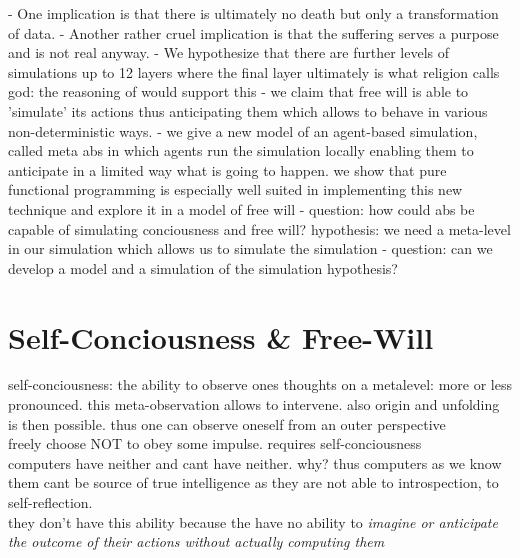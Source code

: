 \documentclass[twocolumn]{article}
\begin{document}
- One implication is that there is ultimately no death but only a transformation of data.
- Another rather cruel implication is that the suffering serves a purpose and is not real anyway.
- We hypothesize that there are further levels of simulations up to 12 layers where the final layer ultimately is what religion calls god: the reasoning of \cite{steinhart_theological_2010} would support this
- we claim that free will is able to 'simulate' its actions thus anticipating them which allows to behave in various non-deterministic ways.
- we give a new model of an agent-based simulation, called meta abs in which agents run the simulation locally enabling them to anticipate in a limited way what is going to happen. we show that pure functional programming is especially well suited in implementing this new technique and explore it in a model of free will
- question: how could abs be capable of simulating conciousness and free will? hypothesis: we need a meta-level in our simulation which allows us to simulate the simulation
- question: can we develop a model and a simulation of the simulation hypothesis?\\

\section{Self-Conciousness \& Free-Will}
self-conciousness: the ability to observe ones thoughts on a metalevel: more or less pronounced. this meta-observation allows to intervene. also origin and unfolding is then possible. thus one can observe oneself from an outer perspective \\

freely choose NOT to obey some impulse. requires self-conciousness \\

computers have neither and cant have neither. why? thus computers as we know them cant be source of true intelligence as they are not able to introspection, to self-reflection. \\
they don't have this ability because the have no ability to \textit{imagine or anticipate the outcome of their actions without actually computing them}
\end{document}
